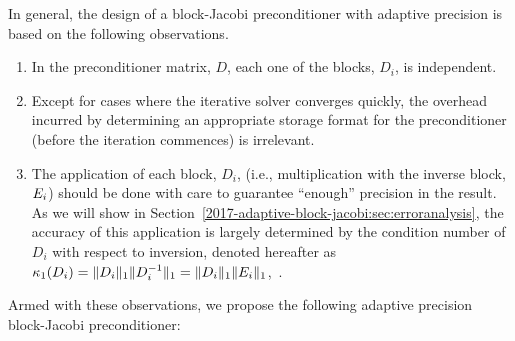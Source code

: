 In general, the design of a block-Jacobi preconditioner with adaptive precision 
is based on
the following observations. 
\begin{enumerate} 
    \item In the preconditioner matrix, $D$, each one of the blocks, $D_i$, is 
    independent. 
    \item Except for cases where the iterative solver converges quickly, 
    the overhead incurred by determining an appropriate 
    storage format for the preconditioner (before the iteration commences) 
    is irrelevant. 
    \item The application of each block, $D_i$,
    (i.e., multiplication with the inverse block, $E_i$)
    should be done with care to guarantee
    ``enough'' precision in the result. 
        As we will show in Section~\ref{2017-adaptive-block-jacobi:sec:erroranalysis}, the accuracy of
this application is largely determined by the condition number of $D_i$
with respect to inversion, denoted hereafter as $\kappa_1(D_i) =
\|D_{i}\|_1 \|D_{i}^{-1}\|_1 = \|D_{i}\|_1 \|E_{i}\|_1$,~\cite{GVL3}. 
\end{enumerate} 
Armed with these observations, we propose the following adaptive precision
block-Jacobi preconditioner: 
